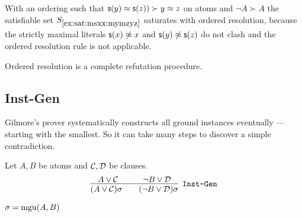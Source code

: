 \begin{example}
	With an ordering such that \( \mathsf{s}(y)\approx\mathsf{s}(z)) \succ y\approx z \) on atoms and \( {\lnot A} \succ A \)
	the satisfiable set \( S_{\ref{ex:sat:msxx:mymzyz}} \) saturates with ordered resolution,
	because the strictly maximal literals
	\( \mathsf{s}(x)\not\approx x \) and
	\( \mathsf{s}(y)\not\approx\mathsf{s}(z) \)
	do not clash and the ordered resolution rule is not applicable.
\end{example}



\begin{lemma}
	Ordered resolution is a complete refutation procedure.
\end{lemma}




\subsection{Inst-Gen}\label{sec:inst:gen}

Gilmore's prover systematically constructs all ground instances eventually --- starting with the smallest. So it can take many steps to discover a simple contradiction.

\begin{definition} Let \( A, B \) be atoms and \( \mathcal{C},\mathcal{D} \) be clauses.
	\begin{gather*}
	\infer
	[{\InstGen}]
	{(A\lor\mathcal C)\sigma\qquad (\lnot B\lor\mathcal D)\sigma}
	{A\lor\mathcal C\quad&\quad \lnot B\lor\mathcal D}
	\end{gather*}
	\begin{center}\( \sigma=\operatorname{mgu}(A,B) \)
	\end{center}
\end{definition}

